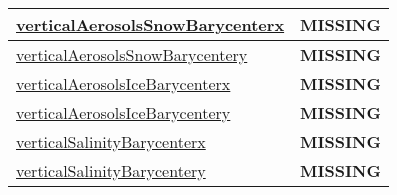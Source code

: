 {\begin{center}
\begin{longtable}{| p{2.0in} | p{4.0in} |}
    \hline
    \hyperref[subsec:var_sec_tracer_barycenter_verticalAerosolsSnowBarycenterx]{verticalAerosolsSnowBarycenterx} & {\bf \color{red} MISSING} \\
    \hline
    \hyperref[subsec:var_sec_tracer_barycenter_verticalAerosolsSnowBarycentery]{verticalAerosolsSnowBarycentery} & {\bf \color{red} MISSING} \\
    \hline
    \hyperref[subsec:var_sec_tracer_barycenter_verticalAerosolsIceBarycenterx]{verticalAerosolsIceBarycenterx} & {\bf \color{red} MISSING} \\
    \hline
    \hyperref[subsec:var_sec_tracer_barycenter_verticalAerosolsIceBarycentery]{verticalAerosolsIceBarycentery} & {\bf \color{red} MISSING} \\
    \hline
    \hyperref[subsec:var_sec_tracer_barycenter_verticalSalinityBarycenterx]{verticalSalinityBarycenterx} & {\bf \color{red} MISSING} \\
    \hline
    \hyperref[subsec:var_sec_tracer_barycenter_verticalSalinityBarycentery]{verticalSalinityBarycentery} & {\bf \color{red} MISSING} \\
    \hline
\end{longtable}
\end{center}
}
